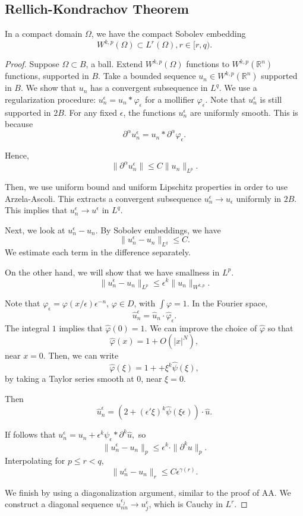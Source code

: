 \documentclass[12pt]{scrartcl}
\newcommand{\R}{\mathbb{R}}
\renewcommand{\hat}{\widehat}
\let \phi \varphi
\begin{document}
\subsection{Rellich-Kondrachov Theorem}
\begin{theorem} In a compact domain $\Omega$, we have the compact Sobolev embedding 
$$W^{k, p}(\Omega) \subset L^r(\Omega), r \in [r, q).$$
\end{theorem}
\begin{proof}
Suppose $\Omega \subset B$, a ball.  Extend $W^{k, p}(\Omega)$ functions to $W^{k, p}(\R^n)$ functions, supported in $B$.  Take a bounded sequence $u_n \in W^{k, p}(\R^n)$ supported in $B$.  We show that $u_n$ has a convergent subsequence in $L^q$.  We use a regularization procedure: $u_n^\epsilon = u_n * \phi_\epsilon$ for a mollifier $\phi_\epsilon$.  Note that $u_n^\epsilon$ is still supported in $2B$.  For any fixed $\epsilon$, the functions $u_n^\epsilon$ are uniformly smooth.  This is because 
$$\partial^\alpha u_n^\epsilon = u_n * \partial^\alpha \phi_\epsilon.$$

Hence,
$$\|\partial^\alpha u_n^\epsilon\| \le C \|u_n\|_{L^p}.$$

Then, we use uniform bound and uniform Lipschitz properties in order to use Arzela-Ascoli.  This extracts a convergent subsequence $u_n^\epsilon \to u_\epsilon$ uniformly in $2B$.  This implies that 
$u_n^\epsilon \to u^\epsilon$ in $L^q$.

Next, we look at $u_n^\epsilon - u_n$.  By Sobolev embeddings, we have 
$$\|u_n^\epsilon - u_n\|_{L^q} \le C.$$
We estimate each term in the difference separately.  

On the other hand, we will show that we have smallness in $L^p$.
$$\|u_n^\epsilon - u_n\|_{L^p} \le \epsilon^{k} \|u_n\|_{W^{k, p}}.$$

Note that $\phi_\epsilon = \phi(x/\epsilon)\epsilon^{-n}$, $\phi \in D$, with $\int \phi = 1$.  In the Fourier space,
$$\hat{u}_n^\epsilon = \hat{u}_n \cdot \hat{\phi}_\epsilon.$$
The integral $1$ implies that $\hat{\phi}(0) = 1$.    We can improve the choice of $\hat{\phi}$ so that 
$$\hat{\phi}(x) = 1 + O(|x|^N),$$
near $x = 0$.  Then, we can write 
$$\hat{\phi}(\xi) = 1 + + \xi^k \hat{\psi}(\xi),$$
by taking a Taylor series smooth at $0$, near $\xi = 0$.

Then 
$$\hat{u}_n^\epsilon = (2 + (\epsilon' \xi)^k \hat{\psi}(\xi \epsilon)) \cdot \hat{u}.$$

If follows that $u_n^\epsilon = u_n+\epsilon^k \psi_\epsilon*\partial^k \hat{u},$
so
$$\|u_n^\epsilon - u_n\|_{p }\le \epsilon^k \cdot \|\partial^k u\|_p.$$
Interpolating for $p \le r < q$, 
$$\|u_n^\epsilon - u_n\|_{r} \le C\epsilon^{\gamma(r)}.$$

We finish by using a diagonalization argument, similar to the proof of AA.  We construct a diagonal sequence $u_{nn}^{\epsilon_j} \to u^\epsilon_j$, which is Cauchy in $L^r$.
\end{proof}
\end{document}
